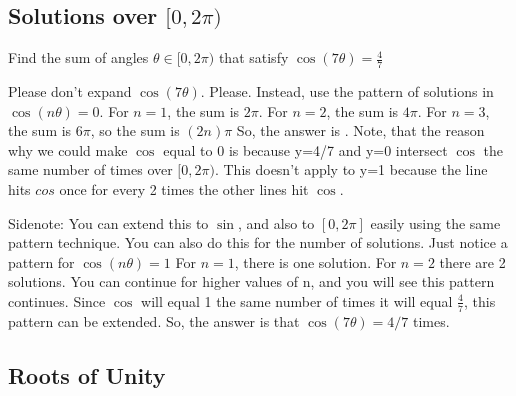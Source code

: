 \documentclass[11pt]{scrartcl}
\begin{document}
\subsection{Solutions over $[0,2\pi)$}
\begin{example}
\begin{problem}
Find the sum of angles $\theta \in [0,2\pi)$ that satisfy $\cos{(7\theta)}=\frac{4}{7}$
\end{problem}

\vspace{5mm}
Please don't expand $\cos{(7\theta)}$. Please.  Instead, use the pattern of solutions in $\cos{(n\theta)} = 0$. For $n=1$, the sum is $2\pi$. For $n=2$, the sum is $4\pi$. For $n=3$, the sum is $6\pi$, so the sum is $(2n)\pi$ So, the answer is . Note, that the reason why we could make $\cos$ equal to 0 is because y=4/7 and y=0 intersect $\cos$ the same number of times over $[0,2\pi)$. This doesn't apply to y=1 because the line hits $cos$ once for every 2 times the other lines hit $\cos$.

\vspace{5mm}
\noindent Sidenote: You can extend this to $\sin$, and also to $[0,2\pi]$ easily using the same pattern technique. You can also do this for the number of solutions. Just notice a pattern for $\cos{(n\theta)} = 1$ For $n=1$, there is one solution. For $n=2$ there are 2 solutions. You can continue for higher values of n, and you will see this pattern continues. Since $\cos$ will equal 1 the same number of times it will equal $\frac{4}{7}$, this pattern can be extended. So, the answer is that $\cos{(7\theta)}=4/7$  times.
\end{example}



\subsection{Roots of Unity}
\end{document}
